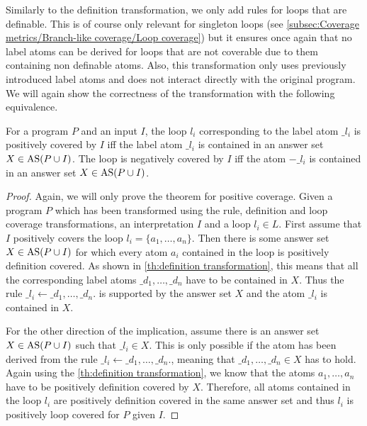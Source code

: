 Similarly to the definition transformation, we only add rules for loops that are definable. This is of course only relevant for singleton loops (see \cref{subsec:Coverage metrics/Branch-like coverage/Loop coverage}) but it ensures once again that no label atoms can be derived for loops that are not coverable due to them containing non definable atoms.
Also, this transformation only uses previously introduced label atoms and does not interact directly with the original program. We will again show the correctness of the transformation with the following equivalence.

\begin{theorem}
\label{th:loop transformation}
    For a program $P$ and an input $I$, the loop $l_i$ corresponding to the label atom $\_l_i$ is positively covered by $I$ iff the label atom $\_l_i$ is contained in an answer set \(X \in \operatorname{AS}(P \cup I)\). The loop is negatively covered by $I$ iff the atom $-\_l_i$ is contained in an answer set \(X \in \operatorname{AS}(P \cup I)\).
\end{theorem}

\begin{proof}
\label{pr:loop transformation}
    Again, we will only prove the theorem for positive coverage.
    Given a program $P$ which has been transformed using the rule, definition and loop coverage transformations, an interpretation $I$ and a loop \(l_i \in L\). First assume that $I$ positively covers the loop \(l_i = \{a_1, \ldots, a_n\}\). Then there is some answer set \(X \in \operatorname{AS}(P \cup I)\) for which every atom $a_i$ contained in the loop is positively definition covered. As shown in \cref{th:definition transformation}, this means that all the corresponding label atoms \(\_d_1, \ldots, \_d_n\) have to be contained in $X$. Thus the rule \(\_l_i \leftarrow \_d_1, \ldots, \_d_n.\) is supported by the answer set $X$ and the atom $\_l_i$ is contained in $X$.

    For the other direction of the implication, assume there is an answer set \(X \in \operatorname{AS}(P \cup I)\) such that \(\_l_i \in X\). This is only possible if the atom has been derived from the rule \(\_l_i \leftarrow \_d_1, \ldots, \_d_n.\), meaning that \(\_d_1, \ldots, \_d_n \in X\) has to hold. Again using the \cref{th:definition transformation}, we know that the atoms \(a_1, \ldots, a_n\) have to be positively definition covered by $X$. Therefore, all atoms contained in the loop $l_i$ are positively definition covered in the same answer set and thus $l_i$ is positively loop covered for $P$ given $I$.
\end{proof}

